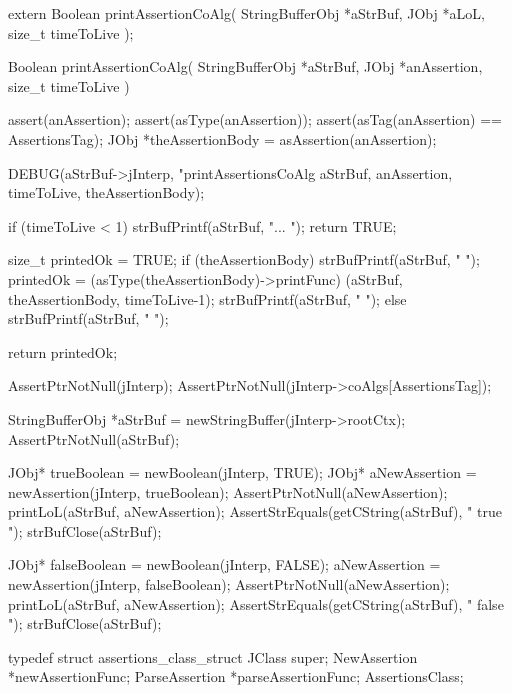 
\startCHeader
extern Boolean printAssertionCoAlg(
  StringBufferObj *aStrBuf,
  JObj            *aLoL,
  size_t           timeToLive
);
\stopCHeader
{}

\startCCode
Boolean printAssertionCoAlg(
  StringBufferObj *aStrBuf,
  JObj            *anAssertion,
  size_t           timeToLive
) {
  assert(anAssertion);
  assert(asType(anAssertion));
  assert(asTag(anAssertion) == AssertionsTag);
  JObj *theAssertionBody = asAssertion(anAssertion);
  
  DEBUG(aStrBuf->jInterp, "printAssertionsCoAlg %
    aStrBuf, anAssertion, timeToLive, theAssertionBody);
    
  if (timeToLive < 1) {
    strBufPrintf(aStrBuf, "... ");
    return TRUE;
  }
  
  size_t printedOk = TRUE;
  if (theAssertionBody) {
    strBufPrintf(aStrBuf, "{ ");
    printedOk =
      (asType(theAssertionBody)->printFunc)
        (aStrBuf, theAssertionBody, timeToLive-1);
    strBufPrintf(aStrBuf, "} ");
  } else {
    strBufPrintf(aStrBuf, "{ } ");
  }

  return printedOk;
}
\stopCCode


\startCTest
  AssertPtrNotNull(jInterp);
  AssertPtrNotNull(jInterp->coAlgs[AssertionsTag]);

  StringBufferObj *aStrBuf = newStringBuffer(jInterp->rootCtx);
  AssertPtrNotNull(aStrBuf);
  
  JObj* trueBoolean   = newBoolean(jInterp,   TRUE);
  JObj* aNewAssertion = newAssertion(jInterp, trueBoolean);
  AssertPtrNotNull(aNewAssertion);
  printLoL(aStrBuf, aNewAssertion);
  AssertStrEquals(getCString(aStrBuf), "{ true } ");
  strBufClose(aStrBuf);
  
  JObj* falseBoolean = newBoolean(jInterp,   FALSE);
  aNewAssertion      = newAssertion(jInterp, falseBoolean);
  AssertPtrNotNull(aNewAssertion);  
  printLoL(aStrBuf, aNewAssertion);
  AssertStrEquals(getCString(aStrBuf), "{ false } ");
  strBufClose(aStrBuf);
\stopCTest
\stopTestCase
\stopTestSuite

\startTestSuite[registerAssertions]

\startCHeader
typedef struct assertions_class_struct {
  JClass       super;
  NewAssertion      *newAssertionFunc;
  ParseAssertion    *parseAssertionFunc;
} AssertionsClass;

